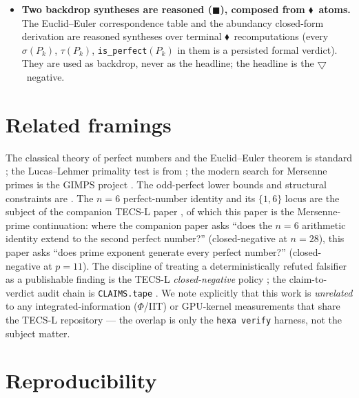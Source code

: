 \documentclass[11pt,a4paper]{article}
\newcommand{\tierF}{\textcolor{blue!60!black}{$\blacklozenge$}}   %
\newcommand{\tierN}{\textcolor{green!50!black}{$\blacksquare$}}    %
\newcommand{\tierX}{\textcolor{red!70!black}{$\bigtriangledown$}}  %
\newcommand{\sig}{\sigma}
\newcommand{\Mp}{M_p}
\theoremstyle{definition}
\begin{document}
\begin{itemize}
$p\in\{11,23,29\}$ and the perfect-number backdrop at $P_1,\dots,P_7$
($p\le 19$). The forward necessary condition and the abundancy closed form are
unbounded closed-form facts, but the \emph{negative} is asserted only as
``$p$ prime does not imply $\Mp$ prime'' (one counterexample suffices); it is not
promoted to a density or distribution claim about how often $\Mp$ is composite.
\item \textbf{Two backdrop syntheses are reasoned (\tierN), composed from
\tierF\ atoms.} The Euclid--Euler correspondence table and the abundancy
closed-form derivation are reasoned syntheses over terminal \tierF\
recomputations (every $\sig(P_k)$, $\tau(P_k)$, \texttt{is\_perfect}$(P_k)$ in
them is a persisted formal verdict). They are used as backdrop, never as the
headline; the headline is the \tierX\ negative.
\end{itemize}

\section{Related framings}
\label{sec:related}

The classical theory of perfect numbers and the Euclid--Euler theorem is standard
\citep{euclid,euler1849,hardy-wright}; the Lucas--Lehmer primality test is from
\citep{lucas-lehmer-ref}; the modern search for Mersenne primes is the GIMPS
project \citep{gimps}. The odd-perfect lower bounds and structural constraints are
\citep{ochem-rao-2012,ochem-rao-2014,nielsen-2015,goto-ohno,iannucci-1999}. The
$n=6$ perfect-number identity and its $\{1,6\}$ locus are the subject of the
companion TECS-L paper \citep{tecs-l-locus}, of which this paper is the
Mersenne-prime continuation: where the companion paper asks ``does the $n=6$
arithmetic identity extend to the second perfect number?'' (closed-negative at
$n=28$), this paper asks ``does prime exponent generate every perfect number?''
(closed-negative at $p=11$). The discipline of treating a deterministically
refuted falsifier as a publishable finding is the TECS-L \emph{closed-negative}
policy \citep{tecs-l-negative-ok}; the claim-to-verdict audit chain is
\texttt{CLAIMS.tape} \citep{tecs-l-claims}. We note explicitly that this work is
\emph{unrelated} to any integrated-information ($\Phi$/IIT) or GPU-kernel
measurements that share the TECS-L repository --- the overlap is only the
\texttt{hexa verify} harness, not the subject matter.

\section*{Reproducibility}
\end{document}
